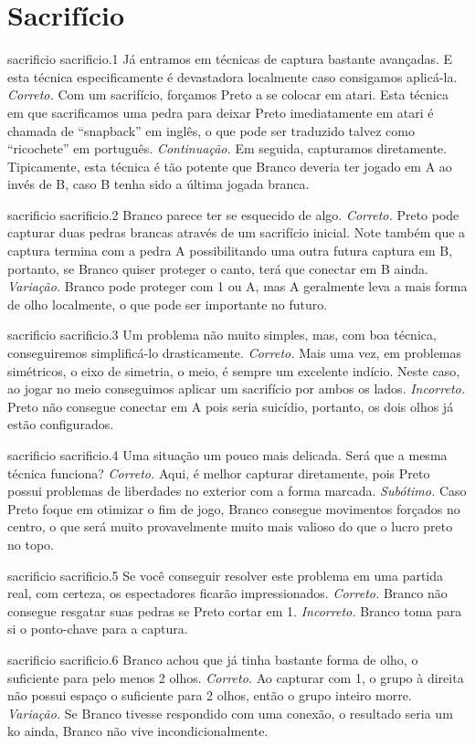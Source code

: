 \chapter{Sacrifício}

\emptypage

\problemAnswerDiagram
  {sacrificio}
  {sacrificio.1}
  {Já entramos em técnicas de captura bastante avançadas. E esta técnica especificamente é devastadora localmente caso consigamos aplicá-la.}
  {\emph{Correto.} Com um sacrifício, forçamos Preto a se colocar em atari. Esta técnica em que sacrificamos uma pedra para deixar Preto imediatamente em atari é chamada de ``snapback'' em inglês, o que pode ser traduzido talvez como ``ricochete'' em português.}
  {\emph{Continuação.} Em seguida, capturamos diretamente. Tipicamente, esta técnica é tão potente que Branco deveria ter jogado em A ao invés de B, caso B tenha sido a última jogada branca.}

\problemAnswerDiagram
  {sacrificio}
  {sacrificio.2}
  {Branco parece ter se esquecido de algo.}
  {\emph{Correto.} Preto pode capturar duas pedras brancas através de um sacrifício inicial. Note também que a captura termina com a pedra A possibilitando uma outra futura captura em B, portanto, se Branco quiser proteger o canto, terá que conectar em B ainda.}
  {\emph{Variação.} Branco pode proteger com 1 ou A, mas A geralmente leva a mais forma de olho localmente, o que pode ser importante no futuro.}

\problemAnswerDiagram
  {sacrificio}
  {sacrificio.3}
  {Um problema não muito simples, mas, com boa técnica, conseguiremos simplificá-lo drasticamente.}
  {\emph{Correto.} Mais uma vez, em problemas simétricos, o eixo de simetria, o meio, é sempre um excelente indício. Neste caso, ao jogar no meio conseguimos aplicar um sacrifício por ambos os lados.}
  {\emph{Incorreto.} Preto não consegue conectar em A pois seria suicídio, portanto, os dois olhos já estão configurados.}

\problemAnswerDiagram
  {sacrificio}
  {sacrificio.4}
  {Uma situação um pouco mais delicada. Será que a mesma técnica funciona?}
  {\emph{Correto.} Aqui, é melhor capturar diretamente, pois Preto possui problemas de liberdades no exterior com a forma marcada.}
  {\emph{Subótimo.} Caso Preto foque em otimizar o fim de jogo, Branco consegue movimentos forçados no centro, o que será muito provavelmente muito mais valioso do que o lucro preto no topo.}

\problemAnswerDiagram
  {sacrificio}
  {sacrificio.5}
  {Se você conseguir resolver este problema em uma partida real, com certeza, os espectadores ficarão impressionados.}
  {\emph{Correto.} Branco não consegue resgatar suas pedras se Preto cortar em 1.}
  {\emph{Incorreto.} Branco toma para si o ponto-chave para a captura.}

\problemAnswerDiagram
  {sacrificio}
  {sacrificio.6}
  {Branco achou que já tinha bastante forma de olho, o suficiente para pelo menos 2 olhos.}
  {\emph{Correto.} Ao capturar com 1, o grupo à direita não possui espaço o suficiente para 2 olhos, então o grupo inteiro morre.}
  {\emph{Variação.} Se Branco tivesse respondido com uma conexão, o resultado seria um ko ainda, Branco não vive incondicionalmente.}